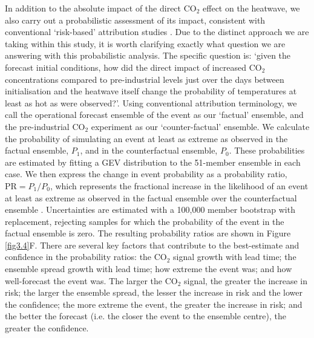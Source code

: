   In addition to the absolute impact of the direct CO$_2$ effect on the heatwave, we also carry out a probabilistic assessment of its impact, consistent with conventional `risk-based' attribution studies \citep{shepherd_common_2016,winsberg_severe_2020}. Due to the distinct approach we are taking within this study, it is worth clarifying exactly what question we are answering with this probabilistic analysis. The specific question is: `given the forecast initial conditions, how did the direct impact of increased CO$_2$ concentrations compared to pre-industrial levels just over the days between initialisation and the heatwave itself change the probability of temperatures at least as hot as were observed?'. Using conventional attribution terminology, we call the operational forecast ensemble of the event as our `factual' ensemble, and the pre-industrial CO$_2$ experiment as our `counter-factual' ensemble. We calculate the probability of simulating an event at least as extreme as observed in the factual ensemble, $P_1$, and in the counterfactual ensemble, $P_0$. These probabilities are estimated by fitting a GEV distribution to the 51-member ensemble in each case. We then express the change in event probability as a probability ratio, $\text{PR}=P_1/P_0$, which represents the fractional increase in the likelihood of an event at least as extreme as observed in the factual ensemble over the counterfactual ensemble \citep{stott_human_2004,stone_end--end_2005}. Uncertainties are estimated with a 100,000 member bootstrap with replacement, rejecting samples for which the probability of the event in the factual ensemble is zero. The resulting probability ratios are shown in Figure \ref{fig3.4}F. There are several key factors that contribute to the best-estimate and confidence in the probability ratios: the CO$_2$ signal growth with lead time; the ensemble spread growth with lead time; how extreme the event was; and how well-forecast the event was. The larger the CO$_2$ signal, the greater the increase in risk; the larger the ensemble spread, the lesser the increase in risk and the lower the confidence; the more extreme the event, the greater the increase in risk; and the better the forecast (i.e. the closer the event to the ensemble centre), the greater the confidence. 
  
